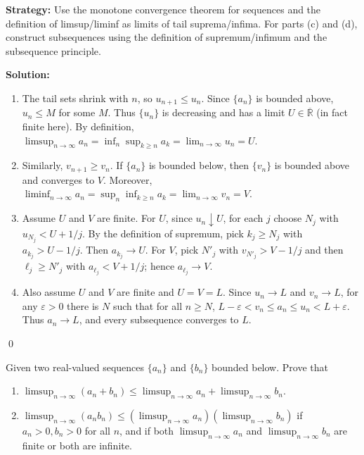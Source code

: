 \noindent\textbf{Strategy:} Use the monotone convergence theorem for sequences and the definition of limsup/liminf as limits of tail suprema/infima. For parts (c) and (d), construct subsequences using the definition of supremum/infimum and the subsequence principle.


\bigskip\noindent\textbf{Solution:}
\begin{enumerate}[label=(\alph*)]
\item The tail sets shrink with \(n\), so \(u_{n+1}\le u_n\). Since \(\{a_n\}\) is bounded above, \(u_n\le M\) for some \(M\). Thus \(\{u_n\}\) is decreasing and has a limit \(U\in\overline{\mathbb{R}}\) (in fact finite here). By definition, \(\limsup_{n\to\infty} a_n=\inf_n \sup_{k\ge n} a_k=\lim_{n\to\infty} u_n=U\).
\item Similarly, \(v_{n+1}\ge v_n\). If \(\{a_n\}\) is bounded below, then \(\{v_n\}\) is bounded above and converges to \(V\). Moreover, \(\liminf_{n\to\infty} a_n=\sup_n \inf_{k\ge n} a_k=\lim_{n\to\infty} v_n=V\).
\item Assume \(U\) and \(V\) are finite. For \(U\), since \(u_n\downarrow U\), for each \(j\) choose \(N_j\) with \(u_{N_j}<U+1/j\). By the definition of supremum, pick \(k_j\ge N_j\) with \(a_{k_j}>U-1/j\). Then \(a_{k_j}\to U\). For \(V\), pick \(N'_j\) with \(v_{N'_j}>V-1/j\) and then \(\ell_j\ge N'_j\) with \(a_{\ell_j}<V+1/j\); hence \(a_{\ell_j}\to V\).
\item Also assume \(U\) and \(V\) are finite and \(U=V=L\). Since \(u_n\to L\) and \(v_n\to L\), for any \(\varepsilon>0\) there is \(N\) such that for all \(n\ge N\), \(L-\varepsilon<v_n\le a_n\le u_n<L+\varepsilon\). Thus \(a_n\to L\), and every subsequence converges to \(L\).
\end{enumerate}\qed


\begin{problembox}
Given two real-valued sequences \(\{a_n\}\) and \(\{b_n\}\) bounded below. Prove that
\begin{enumerate}[label=\alph*)]
\item \(\limsup_{n \to \infty} (a_n + b_n) \leq \limsup_{n \to \infty} a_n + \limsup_{n \to \infty} b_n\).
\item \(\limsup_{n \to \infty} (a_n b_n) \leq (\limsup_{n \to \infty} a_n)(\limsup_{n \to \infty} b_n)\) if \(a_n > 0, b_n > 0\) for all \(n\), and if both \(\limsup_{n \to \infty} a_n\) and \(\limsup_{n \to \infty} b_n\) are finite or both are infinite.
\end{enumerate}
\end{problembox}

